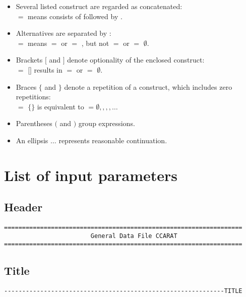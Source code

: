 \begin{itemize}
\item Several listed construct are regarded as concatenated:\\
   $=$  means  consists of  followed by .
\item Alternatives are separated by \kor{}:\\
   $=$  \kor {} means  $=$  or  $=$ ,
  but not  
   $=$  or  $=$ $\emptyset$\@. 
\item Brackets $[$ and $]$ denote optionality of the enclosed 
  construct:\\
   $=$ $[$$]$ results in  $=$  or  $=$
  $\emptyset$\@. 
\item Braces $\{$ and $\}$ denote a repetition of a construct, 
  which includes zero repetitions:\\
   $=$ $\{$$\}$ is equivalent to  $=
  \emptyset,$$,$$,$$,\ldots$
\item Parentheses $($ and $)$ group expressions.
\item An ellipsis $\ldots$ represents reasonable continuation.
\end{itemize}

\section[Input parameters]{List of input parameters}

\subsection{Header}
\begin{verbatim}
==================================================================
                        General Data File CCARAT
==================================================================
\end{verbatim}

\subsection{Title}
\begin{verbatim}
-------------------------------------------------------------TITLE
\end{verbatim}



